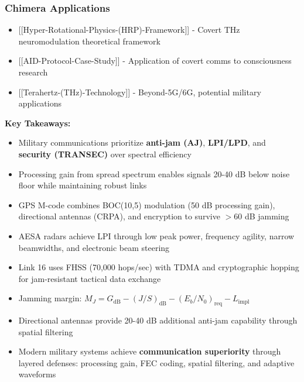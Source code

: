\subsubsection{Chimera Applications}\label{chimera-applications}

\begin{itemize}
\tightlist
\item
  {[}{[}Hyper-Rotational-Physics-(HRP)-Framework{]}{]} - Covert THz
  neuromodulation theoretical framework
\item
  {[}{[}AID-Protocol-Case-Study{]}{]} - Application of covert comms to
  consciousness research
\item
  {[}{[}Terahertz-(THz)-Technology{]}{]} - Beyond-5G/6G, potential
  military applications
\end{itemize}

\textbf{Key Takeaways:}

\begin{itemize}
\item Military communications prioritize \textbf{anti-jam (AJ)}, \textbf{LPI/LPD}, and \textbf{security (TRANSEC)} over spectral efficiency
\item Processing gain from spread spectrum enables signals 20-40 dB below noise floor while maintaining robust links
\item GPS M-code combines BOC(10,5) modulation (50 dB processing gain), directional antennas (CRPA), and encryption to survive $>60$ dB jamming
\item AESA radars achieve LPI through low peak power, frequency agility, narrow beamwidths, and electronic beam steering
\item Link 16 uses FHSS (70,000 hops/sec) with TDMA and cryptographic hopping for jam-resistant tactical data exchange
\item Jamming margin: $M_J = G_{\text{dB}} - (J/S)_{\text{dB}} - (E_b/N_0)_{\text{req}} - L_{\text{impl}}$
\item Directional antennas provide 20-40 dB additional anti-jam capability through spatial filtering
\item Modern military systems achieve \textbf{communication superiority} through layered defenses: processing gain, FEC coding, spatial filtering, and adaptive waveforms
\end{itemize}
